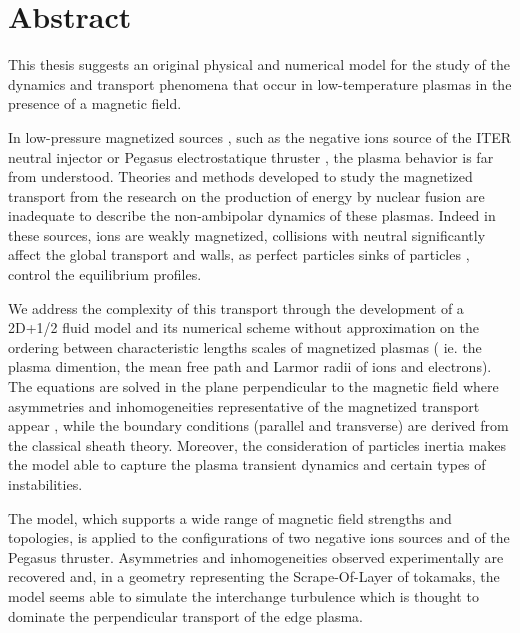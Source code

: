 		\section*{Abstract}
		This thesis suggests an original physical and numerical model for the study
		of the dynamics and transport phenomena that occur in low-temperature plasmas
		in the presence of a magnetic field.

		In low-pressure magnetized sources , such as the negative ions source of the
		ITER neutral injector or Pegasus electrostatique thruster , the plasma
		behavior is far from understood. Theories and methods developed to study the
		magnetized transport from the research on the production of energy by nuclear
		fusion are inadequate to describe the non-ambipolar dynamics of these plasmas.
		Indeed in these sources, ions are weakly magnetized, collisions with neutral
		significantly affect the global transport and walls, as perfect particles
		sinks of particles , control the equilibrium profiles.

		We address the complexity of this transport through the development of a
		2D+1/2 fluid model and its numerical scheme without approximation on the
		ordering between characteristic lengths scales of magnetized plasmas ( ie. the
		plasma dimention, the mean free path and Larmor radii of ions and electrons).
		The equations are solved in the plane perpendicular to the magnetic field
		where asymmetries and inhomogeneities representative of the magnetized
		transport appear , while the boundary conditions (parallel and transverse) are
		derived from the classical sheath theory. Moreover, the consideration of
		particles inertia makes the model able to capture the plasma transient
		dynamics and certain types of instabilities.
	
		The model, which supports a wide range of magnetic field strengths and
		topologies, is applied to the configurations of two negative ions sources and
		of the Pegasus thruster. Asymmetries and inhomogeneities observed
		experimentally are recovered and, in a geometry representing the
		Scrape-Of-Layer of tokamaks, the model seems able to simulate the interchange
		turbulence which is thought to dominate the perpendicular transport of the
		edge plasma.
		  
		
